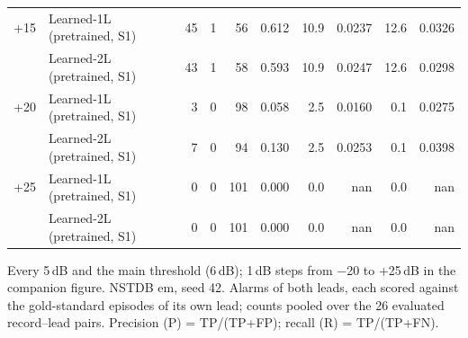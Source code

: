 \begin{table}[htbp]
\begin{tabular}{rlrrrrrrrr}
\midrule
+15 & Learned-1L (pretrained, S1) & 45 & 1 & 56 & 0.612 & 10.9 & 0.0237 & 12.6 & 0.0326 \\
 & Learned-2L (pretrained, S1) & 43 & 1 & 58 & 0.593 & 10.9 & 0.0247 & 12.6 & 0.0298 \\
\midrule
+20 & Learned-1L (pretrained, S1) & 3 & 0 & 98 & 0.058 & 2.5 & 0.0160 & 0.1 & 0.0275 \\
 & Learned-2L (pretrained, S1) & 7 & 0 & 94 & 0.130 & 2.5 & 0.0253 & 0.1 & 0.0398 \\
\midrule
+25 & Learned-1L (pretrained, S1) & 0 & 0 & 101 & 0.000 & 0.0 & nan & 0.0 & nan \\
 & Learned-2L (pretrained, S1) & 0 & 0 & 101 & 0.000 & 0.0 & nan & 0.0 & nan \\
\bottomrule
\end{tabular}

\par\smallskip\footnotesize Every 5\,dB and the main threshold (6\,dB); 1\,dB steps from $-$20 to +25\,dB in the companion figure. NSTDB em, seed 42. Alarms of both leads, each scored against the gold-standard episodes of its own lead; counts pooled over the 26 evaluated record--lead pairs. Precision (P) = TP/(TP+FP); recall (R) = TP/(TP+FN).
\end{table}

